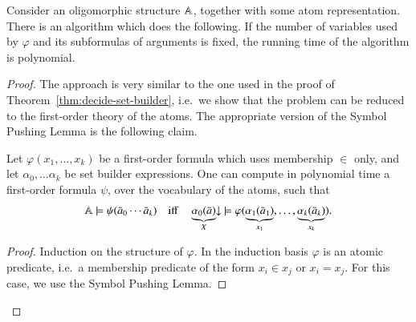 \begin{lemma}\label{lem:downset-lemma} 
	Consider an oligomorphic structure $\mathbb A$, together with some atom representation. There is an algorithm which does the following.
	If the number of variables used by $\varphi$ and its subformulas of arguments is  fixed, the running time of the algorithm is polynomial.
\end{lemma}
\begin{proof}
	The approach is very similar to the one used in the proof of Theorem~\ref{thm:decide-set-builder}, i.e.~we show that the problem can be reduced to the first-order theory of the atoms. The appropriate version of the Symbol Pushing Lemma is the following claim.
		\begin{claim} \label{claim:third-symbol-pushing} Let $\varphi(x_1,\ldots,x_k)$ be a first-order formula which uses membership $\in$ only, and  let $\alpha_0,\ldots\alpha_k$ be set builder expressions. One can compute in polynomial time a first-order formula $\psi$, over the vocabulary of the atoms,  such that 
		\begin{align*}
			\mathbb A \models \psi(\bar a_0 \cdots \bar a_k) 
			\quad \text{iff} \quad
	\underbrace{\alpha_0(\bar a)}_X\!\!\downarrow\ \models \varphi(\underbrace{\alpha_1(\bar a_1)}_{x_1},\ldots,\underbrace{\alpha_k(\bar a_k)}_{x_k}).
\end{align*}
	\end{claim}
	\begin{proof} Induction on the  structure of $\varphi$.
	    In the induction basis  $\varphi$ is an atomic predicate, i.e.~a membership predicate of the form  $x_i \in x_j$ or $x_i = x_j$. For this case, we use the Symbol Pushing Lemma. 
		

\end{proof}
\end{proof}
